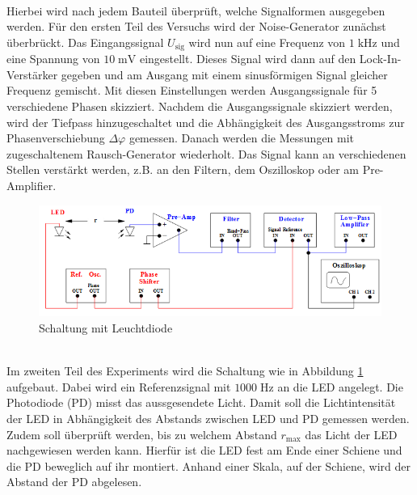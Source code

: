 \\
Hierbei wird nach jedem Bauteil überprüft, welche Signalformen ausgegeben werden.
Für den ersten Teil des Versuchs wird der Noise-Generator zunächst überbrückt.
Das Eingangssignal $U_\text{sig}$ wird nun auf eine Frequenz von $1\;\si{\kilo\hertz}$
und eine Spannung von $10\;\si{\milli\volt}$ eingestellt. Dieses Signal wird dann
auf den Lock-In-Verstärker gegeben und am Ausgang mit einem sinusförmigen Signal gleicher
Frequenz gemischt. Mit diesen Einstellungen werden Ausgangssignale für 5 verschiedene
Phasen skizziert.
Nachdem die Ausgangssignale skizziert werden, wird der Tiefpass hinzugeschaltet
und die Abhängigkeit des Ausgangsstroms zur Phasenverschiebung
$\Delta\varphi$ gemessen.
Danach werden die Messungen mit zugeschaltenem Rausch-Generator wiederholt. Das Signal
kann an verschiedenen Stellen verstärkt werden, z.B. an den Filtern, dem Oszilloskop
oder am Pre-Amplifier.
\\
\begin{figure}
  \centering
  \includegraphics[width=\textwidth]{Bilder/LEDSchaltung.jpg}
  \caption{Schaltung mit Leuchtdiode \cite{303}}
  \label{fig:LED}
\end{figure}  %
\\
Im zweiten Teil des Experiments wird die Schaltung wie in Abbildung \ref{fig:LED}
aufgebaut. Dabei wird ein Referenzsignal mit $1000 \;\si{\hertz}$ an die LED angelegt.
Die Photodiode (PD) misst das aussgesendete Licht.
Damit soll die Lichtintensität der LED in Abhängigkeit des Abstands
zwischen LED und PD gemessen werden. Zudem soll überprüft werden, bis zu welchem
Abstand $r_\text{max}$ das Licht der LED nachgewiesen werden kann. Hierfür
ist die LED fest am Ende einer Schiene und die PD beweglich auf ihr montiert.
Anhand einer Skala, auf der Schiene, wird der Abstand der PD abgelesen.
\newpage

